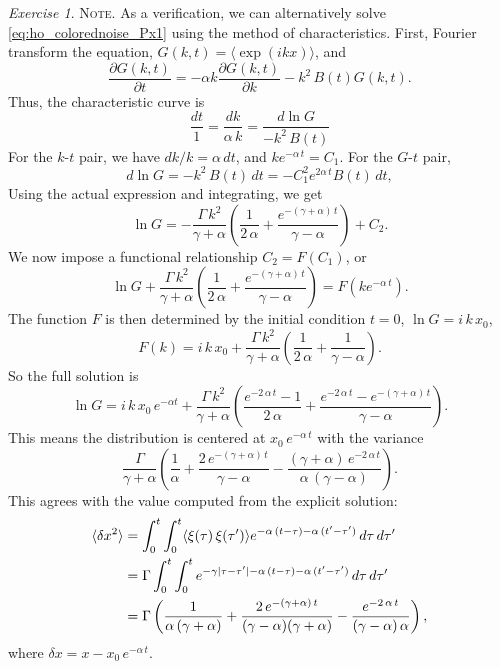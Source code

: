 \documentclass{book}
\numberwithin{equation}{section}
\theoremstyle{plain}
\theoremstyle{definition}
\theoremstyle{remark}
\theoremstyle{BoldStyle}
\newtheorem{exercise}{Exercise}
\numberwithin{exercise}{section}
\newcommand{\note}[1]{{\color{DarkGreen}\footnotesize \textsc{Note.} #1}}
\begin{document}
\begin{exercise}
  \note{
    As a verification,
    we can alternatively solve \eqref{eq:ho_colorednoise_Px1} using
    the method of characteristics.
    First, Fourier transform the equation,
    $G(k,t) = \langle \exp(ikx) \rangle$,
    and
    $$
    \frac{ \partial G(k, t) } { \partial t }
    =
    -\alpha k \frac{ \partial G(k, t) } { \partial k }
    - k^2 \, B(t) G(k, t).
    $$
    Thus, the characteristic curve is
    $$
    \frac{ dt } { 1 }
    =
    \frac{ dk } { \alpha \, k }
    =
    \frac{ d\ln G } { -k^2 \, B(t) }
    $$
    For the $k$-$t$ pair, we have $dk/k = \alpha \, dt$,
    and $k e^{-\alpha \, t} = C_1$.
    For the $G$-$t$ pair,
    $$
    d\ln G = -k^2 \, B(t) \, dt = -C_1^2 e^{2\alpha\, t} B(t) \, dt,
    $$
    Using the actual expression and integrating, we get
    $$
    \ln G = -\frac{\Gamma \, k^2 }{ \gamma + \alpha }
    \left( \frac{1}{2 \, \alpha} + \frac{e^{-(\gamma + \alpha) \,t }}{\gamma - \alpha} \right)
    + C_2.
    $$
    We now impose a functional relationship $C_2 = F(C_1)$, or
    $$
    \ln G + \frac{\Gamma \, k^2 }{ \gamma + \alpha }
    \left( \frac{1}{2 \, \alpha} + \frac{e^{-(\gamma + \alpha) \,t }}{\gamma - \alpha} \right)
    = F(ke^{-\alpha \, t}).
    $$
    The function $F$ is then determined by the initial condition $t = 0$,
    $\ln G = i \, k \, x_0$,
    $$
    F(k) = i \, k \, x_0 + \frac{\Gamma \, k^2 }{ \gamma + \alpha }
    \left( \frac{1}{2 \, \alpha} + \frac{1}{\gamma - \alpha} \right).
    $$
    So the full solution is
    $$
    \ln G = i \, k \, x_0 \, e^{-\alpha t} + \frac{\Gamma \, k^2 }{ \gamma + \alpha }
    \left( \frac{e^{-2 \, \alpha \, t} - 1}{2 \, \alpha}
    + \frac{e^{-2 \, \alpha \, t} - e^{-(\gamma + \alpha) \, t} }{\gamma - \alpha} \right).
    $$
    This means the distribution is centered at $x_0 \, e^{-\alpha \, t}$
    with the variance
    $$
    \frac{\Gamma }{ \gamma + \alpha }
    \left( \frac{1}{\alpha}
    + \frac{ 2 \, e^{-(\gamma + \alpha) \, t} }{\gamma - \alpha}
    - \frac{ (\gamma + \alpha) \, e^{-2\, \alpha \, t} }{\alpha \, (\gamma - \alpha)} \right).
    $$
    This agrees with the value computed from the explicit solution:
    \begin{align}
    \langle \delta x^2 \rangle
     &=
    \int_0^t\int_0^t \langle \xi(\tau) \, \xi(\tau') \rangle
    e^{-\alpha \, (t-\tau)- \alpha \, (t'-\tau')} \, d\tau \, d\tau'
    \notag \\
     &=
    \Gamma \int_0^t\int_0^t
    e^{-\gamma|\tau - \tau'|-\alpha \, (t-\tau) - \alpha \, (t'-\tau')} \, d\tau \, d\tau'
    \notag
    \\
     &=
    \Gamma
    \left(
      \frac{1}{\alpha \,(\gamma + \alpha) }
      +
      \frac{2 \, e^{-(\gamma + \alpha) \, t} }{(\gamma - \alpha) (\gamma + \alpha) }
      -
      \frac{e^{-2 \, \alpha \, t} }{(\gamma - \alpha) \, \alpha }
    \right),
    \notag
    \end{align}
    where
    $\delta x = x - x_0 \, e^{-\alpha \, t}$.
  }

\end{exercise}
\end{document}
